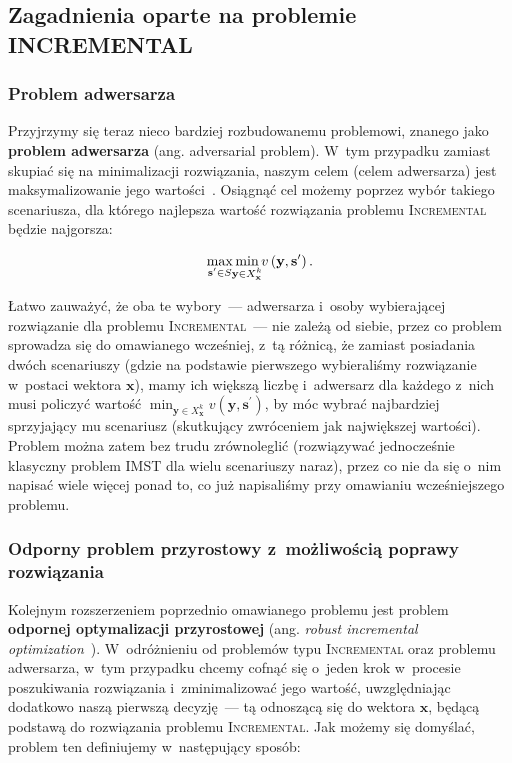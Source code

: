 \subsection{Zagadnienia oparte na problemie INCREMENTAL}



\subsubsection{Problem adwersarza}\label{sec:adv}


Przyjrzymy się teraz nieco bardziej rozbudowanemu problemowi, znanego jako \textbf{problem adwersarza} (ang. adversarial problem).
W~tym przypadku zamiast skupiać się na minimalizacji rozwiązania, naszym celem (celem adwersarza) jest maksymalizowanie jego wartości~\cite[$2$]{DBLP:journals/corr/NasrabadiO13}.
Osiągnąć cel możemy poprzez wybór takiego scenariusza, dla którego najlepsza wartość rozwiązania problemu \textsc{Incremental} będzie najgorsza:

\begin{equation}
	\max_{\mathclap{\textbf{s}^{\prime} \in S}} \min_{\mathclap{\textbf{y} \in X^{k}_{\textbf{x}}}} v \left( \textbf{y}, \textbf{s}^{\prime} \right)\text{.}
\end{equation}

Łatwo zauważyć, że oba te wybory~--- adwersarza i~osoby wybierającej rozwiązanie dla problemu \textsc{Incremental}~--- nie zależą od siebie, przez co problem sprowadza się do omawianego wcześniej, z~tą różnicą, że zamiast posiadania dwóch scenariuszy (gdzie na podstawie pierwszego wybieraliśmy rozwiązanie w~postaci wektora $\textbf{x}$), mamy ich większą liczbę i~adwersarz dla każdego z~nich musi policzyć wartość $\min_{\textbf{y} \in X^{k}_{\textbf{x}}} v \left( \textbf{y}, \textbf{s}^{\prime} \right)$, by móc wybrać najbardziej sprzyjający mu scenariusz (skutkujący zwróceniem jak największej wartości).
Problem można zatem bez trudu zrównoleglić (rozwiązywać jednocześnie klasyczny problem \textsc{IMST} dla wielu scenariuszy naraz), przez co nie da się o~nim napisać wiele więcej ponad to, co już napisaliśmy przy omawianiu wcześniejszego problemu.


\subsubsection{Odporny problem przyrostowy z~możliwością poprawy rozwiązania}\label{sub:rrimst}


Kolejnym rozszerzeniem poprzednio omawianego problemu jest problem \textbf{odpornej optymalizacji przyrostowej} (ang. \textit{robust incremental optimization}~\cite[$2$]{DBLP:journals/corr/NasrabadiO13}).
W~odróżnieniu od problemów typu \textsc{Incremental} oraz problemu adwersarza, w~tym przypadku chcemy cofnąć się o~jeden krok w~procesie poszukiwania rozwiązania i~zminimalizować jego wartość, uwzględniając dodatkowo naszą pierwszą decyzję~--- tą odnoszącą się do wektora $\textbf{x}$, będącą podstawą do rozwiązania problemu \textsc{Incremental}.
Jak możemy się domyślać, problem ten definiujemy w~następujący sposób:

